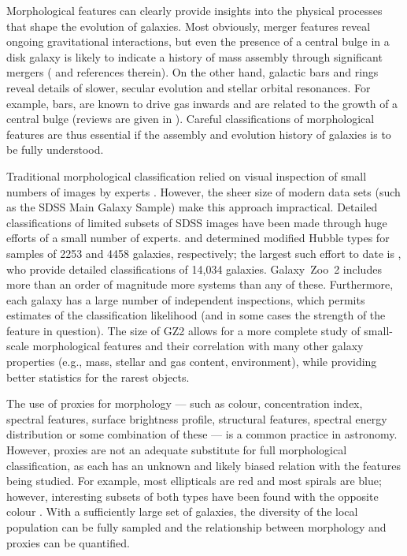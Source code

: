 \documentclass[useAMS,usenatbib]{mn2e}
\begin{document}
Morphological features can clearly provide insights into the physical processes that shape the evolution of galaxies. Most obviously, merger features reveal ongoing gravitational interactions, but even the presence of a central bulge in a disk galaxy is likely to indicate a history of mass assembly through significant mergers (\citealt{mar12} and references therein). On the other hand, galactic bars and rings reveal details of slower, secular evolution and stellar orbital resonances. For example, bars, are known to drive gas inwards and are related to the growth of a central bulge (reviews are given in \citealt{kor04,mas11c}). Careful classifications of morphological features are thus essential if the assembly and evolution history of galaxies is to be fully understood.

Traditional morphological classification relied on visual inspection of small numbers of images by experts \citep[e.g., ][]{san61,san94,dev91,but95,but02}. However, the sheer size of modern data sets (such as the SDSS Main Galaxy Sample) make this approach impractical. Detailed classifications of limited subsets of SDSS images have been made through huge efforts of a small number of experts. \citet{fuk07} and \citet{bai11} determined modified Hubble types for samples of 2253 and 4458 galaxies, respectively; the largest such effort to date is \citet{nai10}, who provide detailed classifications of 14,034 galaxies. Galaxy~Zoo~2 includes more than an order of magnitude more systems than any of these. Furthermore, each galaxy has a large number of independent inspections, which permits estimates of the classification likelihood (and in some cases the strength of the feature in question). The size of GZ2 allows for a more complete study of small-scale morphological features and their correlation with many other galaxy properties (e.g., mass, stellar and gas content, environment), while providing better statistics for the rarest objects.

The use of proxies for morphology --- such as colour, concentration index, spectral features, surface brightness profile, structural features, spectral energy distribution or some combination of these --- is a common practice in astronomy. However, proxies are not an adequate substitute for full morphological classification, as each has an unknown and likely biased relation with the features being studied. For example, most ellipticals are red and most spirals are blue; however, interesting subsets of both types have been found with the opposite colour \citep{sch09,mas10a}. With a sufficiently large set of galaxies, the diversity of the local population can be fully sampled and the relationship between morphology and proxies can be quantified.
\end{document}
